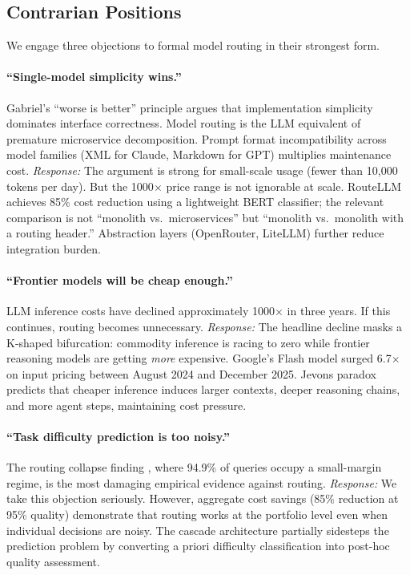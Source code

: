 \documentclass[11pt, a4paper]{googledeepmind}
\begin{document}
\subsection{Contrarian Positions}

We engage three objections to formal model routing in their strongest form.

\paragraph{``Single-model simplicity wins.''} Gabriel's ``worse is better'' principle \citep{gabriel1989} argues that implementation simplicity dominates interface correctness. Model routing is the LLM equivalent of premature microservice decomposition. Prompt format incompatibility across model families (XML for Claude, Markdown for GPT) multiplies maintenance cost. \emph{Response:} The argument is strong for small-scale usage (fewer than 10,000 tokens per day). But the 1000$\times$ price range is not ignorable at scale. RouteLLM achieves 85\% cost reduction using a lightweight BERT classifier; the relevant comparison is not ``monolith vs.\ microservices'' but ``monolith vs.\ monolith with a routing header.'' Abstraction layers (OpenRouter, LiteLLM) further reduce integration burden.

\paragraph{``Frontier models will be cheap enough.''} LLM inference costs have declined approximately 1000$\times$ in three years. If this continues, routing becomes unnecessary. \emph{Response:} The headline decline masks a K-shaped bifurcation: commodity inference is racing to zero while frontier reasoning models are getting \emph{more} expensive. Google's Flash model surged 6.7$\times$ on input pricing between August 2024 and December 2025. Jevons paradox predicts that cheaper inference induces larger contexts, deeper reasoning chains, and more agent steps, maintaining cost pressure.

\paragraph{``Task difficulty prediction is too noisy.''} The routing collapse finding \citep{routingcollapse2026}, where 94.9\% of queries occupy a small-margin regime, is the most damaging empirical evidence against routing. \emph{Response:} We take this objection seriously. However, aggregate cost savings (85\% reduction at 95\% quality) demonstrate that routing works at the portfolio level even when individual decisions are noisy. The cascade architecture partially sidesteps the prediction problem by converting a priori difficulty classification into post-hoc quality assessment.
\end{document}
